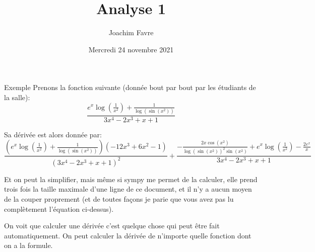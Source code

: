 \documentclass[a4paper]{article}
\title{Analyse 1}
\author{Joachim Favre}
\date{Mercredi 24 novembre 2021}
\begin{document}
\maketitle


\begin{parag}{Exemple}
    Prenons la fonction suivante (donnée bout par bout par les étudiants de la salle):
    \[\frac{e^{x} \log{\left(\frac{1}{x^{2}} \right)} + \frac{1}{\log{\left(\sin{\left(x^{2} \right)} \right)}}}{3 x^{4} - 2 x^{3} + x + 1}\]

    Sa dérivée est alors donnée par:
    \[\frac{\left(e^{x} \log{\left(\frac{1}{x^{2}} \right)} + \frac{1}{\log{\left(\sin{\left(x^{2} \right)} \right)}}\right) \left(- 12 x^{3} + 6 x^{2} - 1\right)}{\left(3 x^{4} - 2 x^{3} + x + 1\right)^{2}} + \frac{- \frac{2 x \cos{\left(x^{2} \right)}}{\log{\left(\sin{\left(x^{2} \right)} \right)}^{2} \sin{\left(x^{2} \right)}} + e^{x} \log{\left(\frac{1}{x^{2}} \right)} - \frac{2 e^{x}}{x}}{3 x^{4} - 2 x^{3} + x + 1}\]

    Et on peut la simplifier, mais même si sympy me permet de la calculer, elle prend trois fois la taille maximale d'une ligne de ce document, et il n'y a aucun moyen de la couper proprement (et de toutes façons je parie que vous avez pas lu complètement l'équation ci-dessus).

    On voit que calculer une dérivée c'est quelque chose qui peut être fait automatiquement. On peut calculer la dérivée de n'importe quelle fonction dont on a la formule.
\end{parag}
\end{document}
